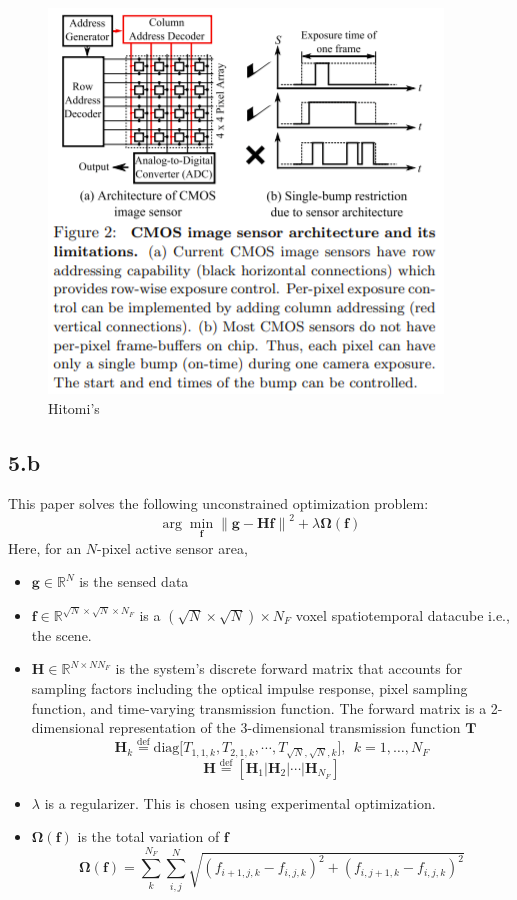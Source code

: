 \documentclass[12pt]{article}
\begin{document}
\begin{figure}[ht]
	\centering
	\includegraphics[scale=0.75]{Hitomi.png}
	\caption{Hitomi's}
\end{figure}
\subsection*{5.b}
This paper solves the following unconstrained optimization problem:
$$\arg \min_{\mathbf{f}}\left\lVert\mathbf{g - Hf}\right\rVert^2 + \lambda \mathbf{\Omega}(\mathbf{f}) $$
Here, for an $N$-pixel active sensor area, 
\begin{itemize}
\item $\mathbf{g} \in \mathbb{R}^N$ is the sensed data
\item $\mathbf{f} \in \mathbb{R}^{\sqrt{N} \times \sqrt{N} \times N_F}$ is a $(\sqrt{N} \times \sqrt{N}) \times N_F$ voxel spatiotemporal datacube i.e., the scene.
\item $\mathbf{H} \in \mathbb{R}^{N\times NN_F}$ is the system’s discrete forward matrix that accounts for sampling factors
including the optical impulse response, pixel sampling function, and time-varying transmission
function. The forward matrix is a 2-dimensional representation of the 3-dimensional transmission function $\mathbf{T}$
$$\mathbf{H}_k \stackrel{\text{def}}{=} \text{diag} \bigg[T_{1,1,k}, T_{2,1,k}, \cdots, T_{\sqrt{N}, \sqrt{N}, k}\bigg], \:\: k = 1, \ldots, N_F$$
$$\mathbf{H} \stackrel{\text{def}}{=} [\mathbf{H}_1\big| \mathbf{H}_2\big| \cdots \big| \mathbf{H}_{N_F} ]$$
\item $\lambda$ is a regularizer. This is chosen using experimental optimization.
\item $\mathbf{\Omega}(\mathbf{f})$ is the total variation of $\mathbf{f}$
$$\mathbf{\Omega}(\mathbf{f}) = \sum \limits_{k}^{N_F} \sum \limits_{i,j}^N \sqrt{(f_{i+1,j,k} - f_{i,j,k})^2 + (f_{i,j+1,k} - f_{i,j,k})^2}$$
\end{itemize} 
\end{document}
